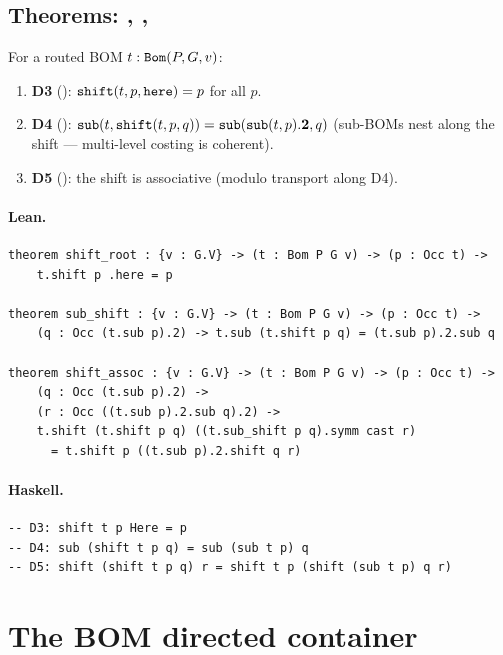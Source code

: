 \documentclass[11pt,a4paper]{article}
\begin{document}
\subsection{Theorems: , , }

\begin{thm}
For a routed BOM $t : \texttt{Bom}(P, G, v)$:
\begin{enumerate}
  \item \textbf{D3} (): $\texttt{shift}(t, p, \texttt{here}) = p$
    for all $p$.
  \item \textbf{D4} (): $\texttt{sub}(t, \texttt{shift}(t, p, q))
    = \texttt{sub}(\texttt{sub}(t, p).\mathbf{2}, q)$ (sub-BOMs nest along the shift ---
    multi-level costing is coherent).
  \item \textbf{D5} (): the shift is associative (modulo
    transport along D4).
\end{enumerate}
\end{thm}

\paragraph{Lean.}
\begin{lstlisting}[style=lean]
theorem shift_root : {v : G.V} -> (t : Bom P G v) -> (p : Occ t) ->
    t.shift p .here = p

theorem sub_shift : {v : G.V} -> (t : Bom P G v) -> (p : Occ t) ->
    (q : Occ (t.sub p).2) -> t.sub (t.shift p q) = (t.sub p).2.sub q

theorem shift_assoc : {v : G.V} -> (t : Bom P G v) -> (p : Occ t) ->
    (q : Occ (t.sub p).2) ->
    (r : Occ ((t.sub p).2.sub q).2) ->
    t.shift (t.shift p q) ((t.sub_shift p q).symm cast r)
      = t.shift p ((t.sub p).2.shift q r)
\end{lstlisting}

\paragraph{Haskell.}
\begin{lstlisting}[style=haskell]
-- D3: shift t p Here = p
-- D4: sub (shift t p q) = sub (sub t p) q
-- D5: shift (shift t p q) r = shift t p (shift (sub t p) q r)
\end{lstlisting}


\section{The BOM directed container}
\end{document}
